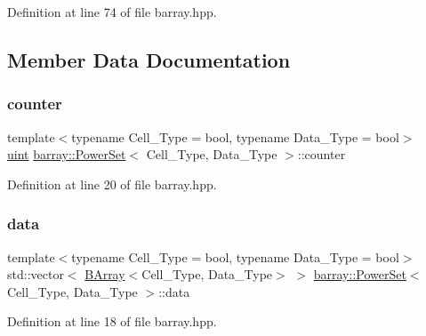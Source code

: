 Definition at line 74 of file barray.\+hpp.



\subsection{Member Data Documentation}
\mbox{\label{classbarray_1_1_power_set_af4dc47b2c5fc2a740fc5ae3f82d80126}} 
\subsubsection{\texorpdfstring{counter}{counter}}
{\footnotesize\ttfamily template$<$typename Cell\+\_\+\+Type  = bool, typename Data\+\_\+\+Type  = bool$>$ \\
\hyperlink{namespacebarray_af9756a31953db233f80a9cfe1ef31c32}{uint} \hyperlink{classbarray_1_1_power_set}{barray\+::\+Power\+Set}$<$ Cell\+\_\+\+Type, Data\+\_\+\+Type $>$\+::counter}



Definition at line 20 of file barray.\+hpp.

\mbox{\label{classbarray_1_1_power_set_a6f01b8c9f6b8931d50e9b50a59816357}} 
\subsubsection{\texorpdfstring{data}{data}}
{\footnotesize\ttfamily template$<$typename Cell\+\_\+\+Type  = bool, typename Data\+\_\+\+Type  = bool$>$ \\
std\+::vector$<$ \hyperlink{classbarray_1_1_b_array}{B\+Array}$<$Cell\+\_\+\+Type, Data\+\_\+\+Type$>$ $>$ \hyperlink{classbarray_1_1_power_set}{barray\+::\+Power\+Set}$<$ Cell\+\_\+\+Type, Data\+\_\+\+Type $>$\+::data}



Definition at line 18 of file barray.\+hpp.

\mbox{\label{classbarray_1_1_power_set_a3b62b4eb9889b2c6eca4b58bc6890892}} 
